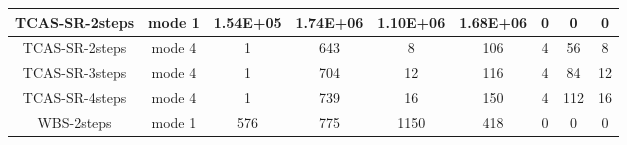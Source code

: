 \begin{table}[]
\begin{tabular}{@{}ccccccccc@{}}
        TCAS-SR-2steps                                              & mode 1                                                       & 1.54E+05                                                   & 1.74E+06                                                     & 1.10E+06                                                       & 1.68E+06                                                               & 0                                                             & 0                                                                      & 0        \\ \midrule
        TCAS-SR-2steps                                              & mode 4                                                       & 1                                                          & 643                                                          & 8                                                              & 106                                                                    & 4                                                             & 56                                                                     & 8        \\ \midrule
        TCAS-SR-3steps                                              & mode 4                                                       & 1                                                          & 704                                                          & 12                                                             & 116                                                                    & 4                                                             & 84                                                                     & 12       \\ \midrule
        TCAS-SR-4steps                                              & mode 4                                                       & 1                                                          & 739                                                          & 16                                                             & 150                                                                    & 4                                                             & 112                                                                    & 16       \\ \midrule
        WBS-2steps                                                  & mode 1                                                       & 576                                                        & 775                                                          & 1150                                                           & 418                                                                    & 0                                                             & 0                                                                      & 0        \\ \midrule

\end{tabular}
\end{table}

